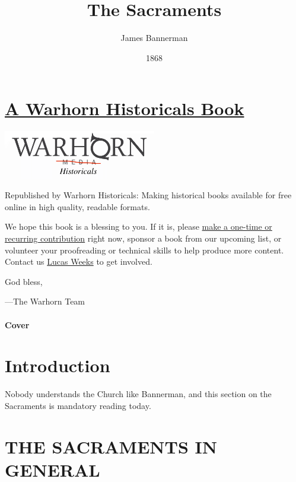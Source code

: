 \documentclass[]{book}
\title{The Sacraments}
\author{James Bannerman}
\date{1868}
\begin{document}
\maketitle

{
\setcounter{tocdepth}{1}
\tableofcontents
}
\hypertarget{a-warhorn-historicals-book}{%
\chapter*{\texorpdfstring{\href{https://historicals.warhornmedia.com/}{A Warhorn Historicals Book}}{A Warhorn Historicals Book}}\label{a-warhorn-historicals-book}}

\includegraphics[width=0.5\textwidth,height=\textheight]{images/warhornlogo.png}

Republished by Warhorn Historicals:
Making historical books available for free online in high quality, readable formats.

We hope this book is a blessing to you. If it is, please \href{https://warhornmedia.com/give}{make a one-time or recurring contribution} right now, sponsor a book from our upcoming list, or volunteer your proofreading or technical skills to help produce more content. Contact us \href{mailto:lucas@beggarsborn.com}{Lucas Weeks} to get involved.

God bless,

---The Warhorn Team

\hypertarget{cover}{%
\subsubsection*{Cover}\label{cover}}

\hypertarget{introduction}{%
\chapter*{Introduction}\label{introduction}}

Nobody understands the Church like Bannerman, and this section on the Sacraments is mandatory reading today.

\hypertarget{the-sacraments-in-general}{%
\chapter{THE SACRAMENTS IN GENERAL}\label{the-sacraments-in-general}}
\end{document}
